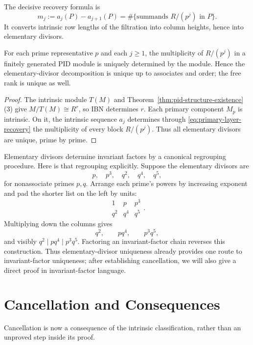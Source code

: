 The decisive recovery formula is
\begin{equation}\label{eq:primary-layer-recovery}
m_j:=a_j(P)-a_{j+1}(P)
=\#\{\text{summands }R/(p^j)\text{ in }P\}.
\end{equation}
It converts intrinsic row lengths of the filtration into column heights,
hence into elementary divisors.

\begin{theorem}
\label{thm:uniqueness-elementary-divisor}
For each prime representative \(p\) and each \(j\geq1\), the multiplicity of
\(R/(p^j)\) in a finitely generated PID module is uniquely determined by the
module. Hence the elementary-divisor decomposition is unique up to associates
and order; the free rank is unique as well.
\end{theorem}
\begin{proof}
The intrinsic module \(T(M)\) and
Theorem~\ref{thm:pid-structure-existence}(3) give
\(M/T(M)\cong R^r\), so IBN determines \(r\). Each primary component
\(M_p\) is intrinsic. On it, the intrinsic sequence \(a_j\)
determines through \eqref{eq:primary-layer-recovery} the multiplicity of every
block \(R/(p^j)\). Thus all elementary divisors are unique, prime by prime.
\end{proof}

Elementary divisors determine invariant factors by a canonical regrouping
procedure. Here is that regrouping explicitly. Suppose the elementary divisors are
\[
p,\quad p^3,\quad q^2,\quad q^4,\quad q^5,
\]
for nonassociate primes \(p,q\).  Arrange each prime's powers by increasing
exponent and pad the shorter list on the left by units:
\[
\begin{array}{ccc}
1&p&p^3\\
q^2&q^4&q^5
\end{array}.
\]
Multiplying down the columns gives
\[
q^2,\qquad pq^4,\qquad p^3q^5,
\]
and visibly \(q^2\mid pq^4\mid p^3q^5\).  Factoring an invariant-factor
chain reverses this construction. Thus elementary-divisor uniqueness already
provides one route to invariant-factor uniqueness; after establishing
cancellation, we will also give a direct proof in invariant-factor language.

\section{Cancellation and Consequences}
Cancellation is now a consequence of the intrinsic classification, rather
than an unproved step inside its proof.

